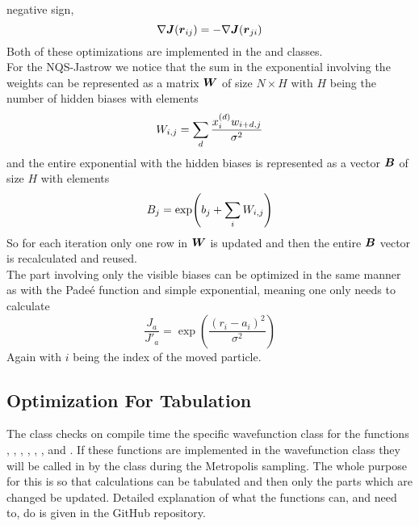     negative sign,
        \begin{equation}
            \nabla \boldsymbol{{J}}(\boldsymbol{{r}}_{ij}) = -\nabla\boldsymbol{{J}}(\boldsymbol{{r}}_{ji})
        \end{equation}
    Both of these optimizations are implemented in the 
    and  classes. \\ 
    For the NQS-Jastrow we notice that the sum in the exponential involving the
    weights can be represented as a matrix $\boldsymbol{{W}}$ of size $N\times H$ with
    $H$ being the number of hidden biases with elements
        \begin{equation}
            W_{i,j} = \sum\limits_{d}\frac{x^{(d)}_iw_{i+d,j}}{\sigma^2}
        \end{equation}
    and the entire exponential with the hidden biases is represented as a
    vector $\boldsymbol{{B}}$ of size $H$ with elements
        \begin{equation}
            B_j = \exp(b_j + \sum\limits_{i} W_{i,j})
        \end{equation}
    So for each iteration only one row in $\boldsymbol{{W}}$ is updated and then the
    entire $\boldsymbol{{B}}$ vector is recalculated and reused. \\ The part involving
    only the visible biases can be optimized in the same manner as with the
    Pade\'e function and simple exponential, meaning one only needs to
    calculate
        \begin{equation}
            \frac{J_a}{J'_a} = \exp(\frac{\left(r_i -
            a_i\right)^2}{\sigma^2})
        \end{equation}
    Again with $i$ being the index of the moved particle.

\subsection{Optimization For Tabulation\label{susec:optTab}}
    The  class checks on compile time the specific
    wavefunction class for the functions , ,
    , , ,
    ,  and
    . If these functions are implemented in the
    wavefunction class they will be called in by the  class
    during the Metropolis sampling. The whole purpose for this is so that
    calculations can be tabulated and then only the parts which are changed be
    updated. Detailed explanation of what the functions can, and need to, do is
    given in the GitHub repository.

